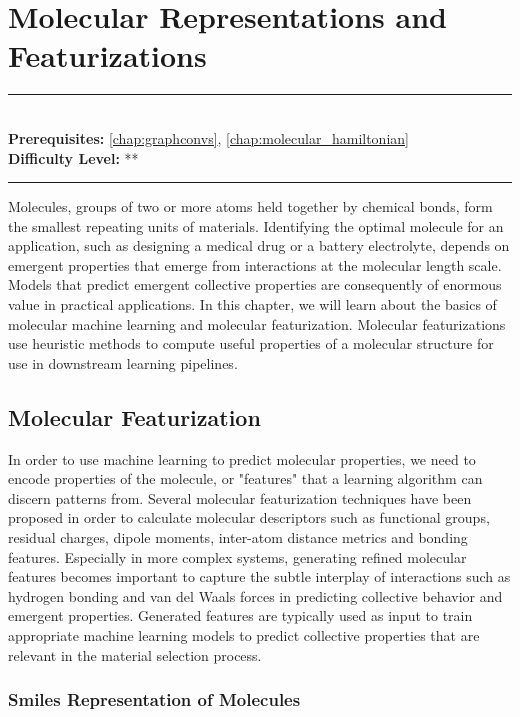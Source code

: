 \documentclass[book.tex]{subfiles}
\begin{document}
\chapter{Molecular Representations and Featurizations}
\label{chap:molecular_ml}
\noindent\rule{11cm}{0.4pt} \\
\textbf{Prerequisites:}
\autoref{chap:graphconvs}, \autoref{chap:molecular_hamiltonian} \\
\textbf{Difficulty Level:} ** \\
\noindent\rule{11cm}{0.4pt}
\vspace{5mm}

Molecules, groups of two or more atoms held together by chemical bonds, form the smallest repeating units of materials. Identifying the optimal molecule for an application, such as designing a medical drug or a battery electrolyte, depends on emergent properties that emerge from interactions at the molecular length scale. Models that predict emergent collective properties are consequently of enormous value in practical applications. In this chapter, we will learn about the basics of molecular machine learning and molecular featurization. Molecular featurizations use heuristic methods to compute useful properties of a molecular structure for use in downstream learning pipelines. 

\section{Molecular Featurization}

In order to use machine learning to predict molecular properties, we need to encode properties of the molecule, or "features" that a learning algorithm can discern patterns from. Several molecular featurization techniques have been proposed in order to calculate molecular descriptors such as functional groups, residual charges, dipole moments, inter-atom distance metrics and bonding features. Especially in more complex systems, generating refined molecular features becomes important to capture the subtle interplay of interactions such as hydrogen bonding and van del Waals forces in predicting collective behavior and emergent properties. Generated features are typically used as input to train appropriate machine learning models to predict collective properties that are relevant in the material selection process. 
\subsection{Smiles Representation of Molecules}
\end{document}
